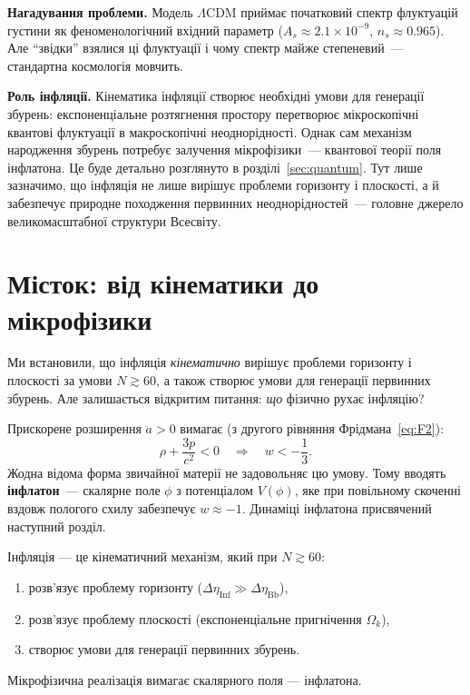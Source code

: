 \textbf{Нагадування проблеми.}
Модель $\Lambda$CDM приймає початковий спектр флуктуацій густини
як феноменологічний вхідний параметр ($A_s \approx 2.1\times10^{-9}$,
$n_s \approx 0.965$). Але \enquote{звідки} взялися ці флуктуації
і чому спектр майже степеневий~--- стандартна космологія мовчить.

\textbf{Роль інфляції.}
Кінематика інфляції створює необхідні умови для генерації збурень:
експоненціальне розтягнення простору перетворює мікроскопічні квантові
флуктуації в макроскопічні неоднорідності. Однак сам механізм
народження збурень потребує залучення мікрофізики~---
квантової теорії поля інфлатона. Це буде детально розглянуто
в розділі~\ref{sec:quantum}. Тут лише зазначимо, що інфляція
не лише вирішує проблеми горизонту і плоскості, а й забезпечує
природне походження первинних неоднорідностей~--- головне
джерело великомасштабної структури Всесвіту.

\section{Місток: від кінематики до мікрофізики}
\label{sec:kinematics_bridge}

Ми встановили, що інфляція \emph{кінематично} вирішує проблеми
горизонту і плоскості за умови $N \gtrsim 60$, а також створює
умови для генерації первинних збурень.
Але залишається відкритим питання: \emph{що} фізично рухає інфляцію?

Прискорене розширення $\ddot{a} > 0$ вимагає (з другого рівняння
Фрідмана~\eqref{eq:F2}):
\begin{equation*}
	\rho + \frac{3p}{c^2} < 0 \quad\Rightarrow\quad w < -\frac{1}{3}.
\end{equation*}
Жодна відома форма звичайної матерії не задовольняє цю умову.
Тому вводять \textbf{інфлатон}~--- скалярне поле $\phi$ з потенціалом
$V(\phi)$, яке при повільному скоченні вздовж пологого схилу
забезпечує $w \approx -1$.
Динаміці інфлатона присвячений наступний розділ.

			Інфляція --- це кінематичний механізм, який при $N \gtrsim 60$:
			\begin{enumerate}
				\item розв'язує проблему горизонту ($\Delta\eta_{\text{Inf}} \gg \Delta\eta_{\text{Bb}}$),
				\item розв'язує проблему плоскості (експоненціальне пригнічення $\Omega_k$),
				\item створює умови для генерації первинних збурень.
			\end{enumerate}
			Мікрофізична реалізація вимагає скалярного поля --- інфлатона.

